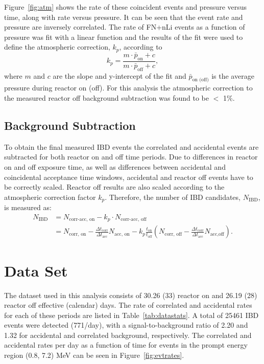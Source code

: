 Figure~\ref{fig:atm} shows the rate of these coincident events and pressure versus time, along with rate versus pressure.
It can be seen that the event rate and pressure are inversely correlated. 
The rate of FN+nLi events as a function of pressure was fit with a linear function and the results of the fit were used to define the atmospheric correction, $k_p$, according to
\begin{equation}
k_p = \frac{m \cdot \bar{p}_{\textrm{on}} + c}{m \cdot \bar{p}_{\textrm{off}} + c},
\end{equation}
where $m$ and $c$ are the slope and y-intercept of the fit and $\bar{p}_{\textrm{on (off)}}$ is the average pressure during reactor on (off).
For this analysis the atmospheric correction to the measured reactor off background subtraction was found to be $<$ 1\%.


\subsection{Background Subtraction}

To obtain the final measured IBD events the correlated and accidental events are subtracted for both reactor on and off time periods.
Due to differences in reactor on and off exposure time, as well as differences between accidental and coincidental acceptance time windows, accidental and reactor off events have to be correctly scaled.
Reactor off results are also scaled according to the atmospheric correction factor $k_p$.
Therefore, the number of IBD candidates, $N_{\textrm{IBD}}$, is measured as:
\begin{equation}
\begin{split}
	N_{\textrm{IBD}} &= N_{\textrm{corr-acc, on}} - k_p \cdot N_{\textrm{corr-acc, off}} \\
				 &= N_{\textrm{corr, on}} - \frac{\Delta t_{\textrm{corr}}}{\Delta t_{\textrm{acc}}} N_{\textrm{acc, on}} - k_p \frac{t_{\textrm{on}}}{t_{\textrm{off}}}\left(N_{\textrm{corr, off}} - \frac{\Delta t_{\textrm{corr}}}{\Delta t_{\textrm{acc}}}N_{\textrm{acc,off}}\right).
\end{split}
\end{equation}


\section{Data Set}

The dataset used in this analysis consists of 30.26 (33) reactor on and 26.19 (28) reactor off effective (calendar) days.
The rate of correlated and accidental rates for each of these periods are listed in Table~\ref{tab:datastats}.
A total of 25461 IBD events were detected (771/day), with a signal-to-background ratio of 2.20 and 1.32 for accidental and correlated background, respectively.
The correlated and accidental rates per day as a function of time for events in the prompt energy region (0.8, 7.2) MeV can be seen in Figure~\ref{fig:evtrates}.

